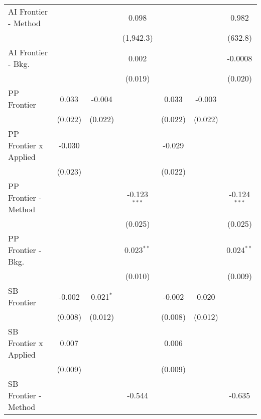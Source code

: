 \begin{tabular}{lcccccc}
   AI Frontier - Method         &               &             & 0.098          &               &         & 0.982\\   
                                &               &             & (1,942.3)      &               &         & (632.8)\\   
   AI Frontier - Bkg.           &               &             & 0.002          &               &         & -0.0008\\   
                                &               &             & (0.019)        &               &         & (0.020)\\   
   PP Frontier                  & 0.033         & -0.004      &                & 0.033         & -0.003  &   \\   
                                & (0.022)       & (0.022)     &                & (0.022)       & (0.022) &   \\   
   PP Frontier x Applied        & -0.030        &             &                & -0.029        &         &   \\   
                                & (0.023)       &             &                & (0.022)       &         &   \\   
   PP Frontier - Method         &               &             & -0.123$^{***}$ &               &         & -0.124$^{***}$\\   
                                &               &             & (0.025)        &               &         & (0.025)\\   
   PP Frontier - Bkg.           &               &             & 0.023$^{**}$   &               &         & 0.024$^{**}$\\   
                                &               &             & (0.010)        &               &         & (0.009)\\   
   SB Frontier                  & -0.002        & 0.021$^{*}$ &                & -0.002        & 0.020   &   \\   
                                & (0.008)       & (0.012)     &                & (0.008)       & (0.012) &   \\   
   SB Frontier x Applied        & 0.007         &             &                & 0.006         &         &   \\   
                                & (0.009)       &             &                & (0.009)       &         &   \\   
   SB Frontier - Method         &               &             & -0.544         &               &         & -0.635\\   

\end{tabular}
